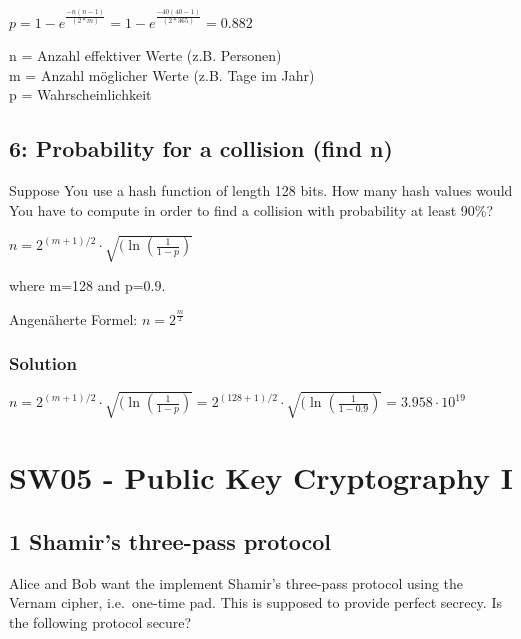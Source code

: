\documentclass[11pt]{article}
\begin{document}
\(p = 1 - e^{\frac{-n(n-1)}{(2*m)}} = 1 - e^{\frac{-40(40-1)}{(2*365)}} = 0.882\)

n = Anzahl effektiver Werte (z.B. Personen)\\
m = Anzahl möglicher Werte (z.B. Tage im Jahr)\\
p = Wahrscheinlichkeit

    \hypertarget{probability-for-a-collision-find-n}{%
\subsection{6: Probability for a collision (find
n)}\label{probability-for-a-collision-find-n}}

Suppose You use a hash function of length 128 bits. How many hash values
would You have to compute in order to find a collision with probability
at least 90\%?

\(n = 2^{(m+1)/2} \cdot \sqrt{(\ln{(\frac{1}{1-p})}}\)

where m=128 and p=0.9.

Angenäherte Formel: \(n = 2^{\frac{m}{2}}\)

\hypertarget{solution}{%
\subsubsection{Solution}\label{solution}}

\(n = 2^{(m+1)/2} \cdot \sqrt{(\ln{(\frac{1}{1-p})}} = 2^{(128+1)/2} \cdot \sqrt{(\ln{(\frac{1}{1-0.9})}} = 3.958 \cdot 10^{19}\)

    

    \hypertarget{sw05---public-key-cryptography-i}{%
\section{SW05 - Public Key Cryptography
I}\label{sw05---public-key-cryptography-i}}

    \hypertarget{shamirs-three-pass-protocol}{%
\subsection{1 Shamir's three-pass
protocol}\label{shamirs-three-pass-protocol}}

Alice and Bob want the implement Shamir's three-pass protocol using the
Vernam cipher, i.e.~one-time pad. This is supposed to provide perfect
secrecy. Is the following protocol secure?
\end{document}
